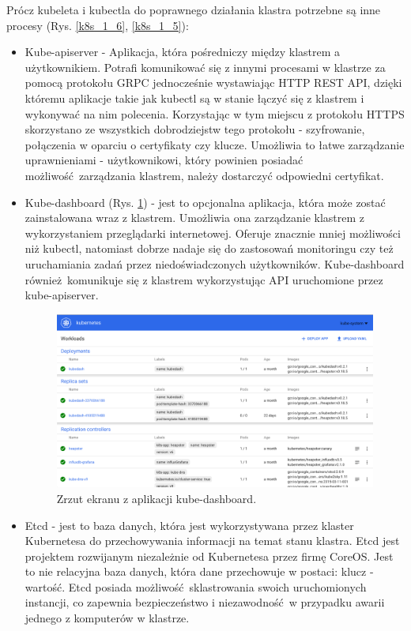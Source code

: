 \documentclass[10pt,a4paper,titlepage,twoside]{report}
\begin{document}
Prócz kubeleta i kubectla do poprawnego działania klastra potrzebne są inne procesy (Rys. \ref{k8s_1_6}, \ref{k8s_1_5}):
\begin{itemize}
\item Kube-apiserver - Aplikacja, która pośredniczy między klastrem a użytkownikiem. Potrafi komunikować się z innymi procesami w klastrze za pomocą protokołu GRPC jednocześnie wystawiając HTTP REST API, dzięki któremu aplikacje takie jak kubectl są w stanie łączyć się z klastrem i wykonywać na nim polecenia. Korzystając w tym miejscu z protokołu HTTPS skorzystano ze wszystkich dobrodziejstw tego protokołu - szyfrowanie, połączenia w oparciu o certyfikaty czy klucze. Umożliwia to łatwe zarządzanie uprawnieniami - użytkownikowi, który powinien posiadać możliwość zarządzania klastrem, należy dostarczyć odpowiedni certyfikat.
\item Kube-dashboard (Rys. \ref{k8s_dash}) - jest to opcjonalna aplikacja, która może zostać zainstalowana wraz z klastrem. Umożliwia ona zarządzanie klastrem z wykorzystaniem przeglądarki internetowej. Oferuje znacznie mniej możliwości niż kubectl, natomiast dobrze nadaje się do zastosowań monitoringu czy też uruchamiania zadań przez niedoświadczonych użytkowników. Kube-dashboard również komunikuje się z klastrem wykorzystując API uruchomione przez kube-apiserver.
\begin{figure}[!h]
	\centering
	\includegraphics[scale=0.17]{pics/kubedash.png}
	\caption{Zrzut ekranu z aplikacji kube-dashboard.}
	\label{k8s_dash}
\end{figure}
\item Etcd \cite{ad37} - jest to baza danych, która jest wykorzystywana przez klaster Kubernetesa do przechowywania informacji na temat stanu klastra. Etcd jest projektem rozwijanym niezależnie od Kubernetesa przez firmę CoreOS. Jest to nie relacyjna baza danych, która dane przechowuje w postaci: klucz - wartość. Etcd posiada możliwość sklastrowania swoich uruchomionych instancji, co zapewnia bezpieczeństwo i niezawodność w przypadku awarii jednego z komputerów w klastrze.

\end{itemize}
\end{document}
